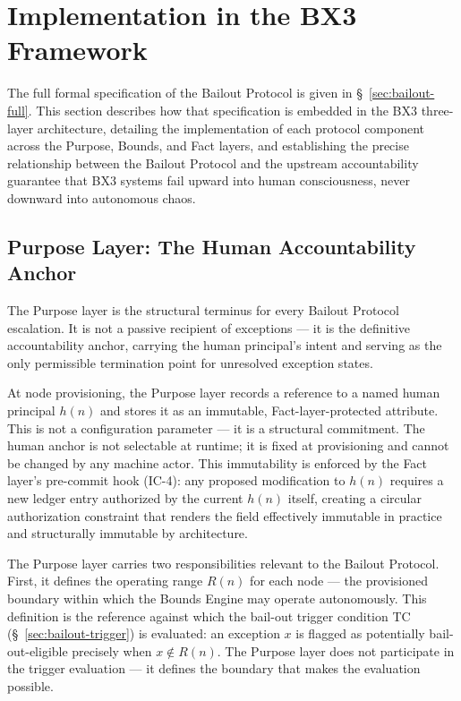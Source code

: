 \section{Implementation in the BX3 Framework}\label{sec:bailout-implementation}

The full formal specification of the Bailout Protocol is given in \S~\ref{sec:bailout-full}.
This section describes how that specification is embedded in the BX3 three-layer
architecture, detailing the implementation of each protocol component across the
Purpose, Bounds, and Fact layers, and establishing the precise relationship
between the Bailout Protocol and the upstream accountability guarantee that
BX3 systems fail upward into human consciousness, never downward into autonomous chaos.

\subsection{Purpose Layer: The Human Accountability Anchor}\label{sec:purpose-anchor}

The Purpose layer is the structural terminus for every Bailout Protocol escalation.
It is not a passive recipient of exceptions — it is the definitive accountability
anchor, carrying the human principal's intent and serving as the only permissible
termination point for unresolved exception states.

At node provisioning, the Purpose layer records a reference to a named human
principal $h(n)$ and stores it as an immutable, Fact-layer-protected attribute.
This is not a configuration parameter — it is a structural commitment.  The
human anchor is not selectable at runtime; it is fixed at provisioning and
cannot be changed by any machine actor.  This immutability is enforced by the
Fact layer's pre-commit hook (IC-4): any proposed modification to $h(n)$ requires
a new ledger entry authorized by the current $h(n)$ itself, creating a circular
authorization constraint that renders the field effectively immutable in
practice and structurally immutable by architecture.

The Purpose layer carries two responsibilities relevant to the Bailout Protocol.
First, it defines the operating range $R(n)$ for each node — the provisioned
boundary within which the Bounds Engine may operate autonomously.  This
definition is the reference against which the bail-out trigger condition TC
(\S~\ref{sec:bailout-trigger}) is evaluated: an exception $x$ is flagged as
potentially bail-out-eligible precisely when $x \notin R(n)$.  The Purpose layer
does not participate in the trigger evaluation — it defines the boundary that
makes the evaluation possible.

